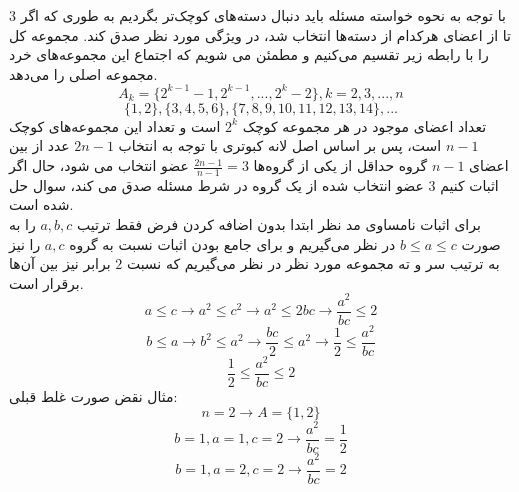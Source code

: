 با توجه به نحوه خواسته مسئله باید دنبال دسته‌های کوچک‌تر بگردیم به طوری که اگر
$3$ 
 تا از اعضای هرکدام از دسته‌ها انتخاب شد، در ویژگی مورد نظر صدق کند. مجموعه کل را با رابطه زیر تقسیم می‌کنیم و مطمئن می شویم که اجتماع این مجموعه‌های خرد مجموعه اصلی را می‌دهد.
    \[A_k = \{2^{k-1}-1,2^{k-1},...,2^{k}-2\} , k=2,3,...,n\]
    \[\{1,2\}, \{3,4,5,6\}, \{7,8,9,10,11,12,13,14\}, ...\]
    تعداد اعضای موجود در هر مجموعه کوچک \(2^k\) است و تعداد این مجموعه‌های کوچک
$n-1$ 
    است، پس بر اساس اصل لانه کبوتری با توجه به انتخاب
$2n-1$ 
    عدد از بین اعضای
$n-1$ 
    گروه حداقل از یکی از گروه‌ها 
    \(\frac{2n-1}{n-1} = 3\) 
    عضو انتخاب می شود، حال اگر اثبات کنیم
$3$ 
     عضو انتخاب شده از یک گروه در شرط مسئله صدق می کند، سوال حل شده است.\\
    برای اثبات نامساوی مد نظر ابتدا بدون اضافه کردن فرض فقط ترتیب
$a, b, c$
      را به صورت
  \(b\leq a\leq c\)
   در نظر می‌گیریم و برای جامع بودن اثبات نسبت به گروه
$a, c$
   را نیز به ترتیب سر و ته مجموعه مورد نظر در نظر می‌گیریم که نسبت
$2$
       برابر نیز بین آن‌ها برقرار است.
    \[a\leq c \to a^2\leq c^2 \to a^2\leq 2bc \to \frac{a^2}{bc}\leq 2\]
    \[b\leq a \to b^2\leq a^2 \to \frac{bc}{2}\leq a^2 \to \frac{1}{2}\leq\frac{a^2}{bc}\]
    \[\frac{1}{2}\leq\frac{a^2}{bc}\leq2\]
    مثال نقض صورت غلط قبلی:
    \[n=2 \to A=\{1,2\}\]
    \[b=1,a=1,c=2 \to \frac{a^2}{bc}=\frac{1}{2}\]
    \[b=1,a=2,c=2 \to \frac{a^2}{bc}=2\]